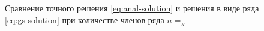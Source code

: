 \begin{figure}[htb]
  \centering
  \caption{Сравнение точного решения \eqref{eq:anal-solution} и
    решения в виде ряда \eqref{eq:gs-solution} при количестве членов
    ряда $n=__N$}
  \label{fig:series-plot}
\end{figure}
